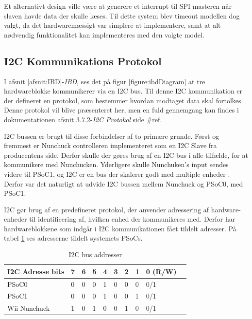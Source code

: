 \noindent Et alternativt design ville være at generere et interrupt til SPI masteren når slaven havde data der skulle læses. Til dette system blev timeout modellen dog valgt, da det hardwaremæssigt var simplere at implementere, samt at alt nødvendig funktionalitet kan implementeres med den valgte model.

\subsection{I2C Kommunikations Protokol}
\label{afsnit:I2CProtokol}
I afsnit \ref{afsnit:IBD}-\textit{IBD}, ses det på figur \ref{figure:ibdDiagram} at tre hardwareblokke kommunikerer via en I2C bus. Til denne I2C kommunikation er der defineret en protokol, som bestemmer hvordan modtaget data skal fortolkes. Denne protokol vil blive præsenteret her, men en fuld gennemgang kan findes i dokumentationen afsnit 3.7.2-\textit{I2C Protokol} side \#ref.\newline

\noindent I2C bussen er brugt til disse forbindelser af to primære grunde. Først og fremmest er Nunchuck controlleren implementeret som en I2C Slave fra producentens side. Derfor skulle der gøres brug af en I2C bus i alle tilfælde, for at kommunikere med Nunchucken. Yderligere skulle Nunchuken's input sendes videre til PSoC1, og I2C er en bus der skalerer godt med multiple enheder \cite{i2cbus}. Derfor var det naturligt at udvide I2C bussen mellem Nunchuck og PSoC0, med PSoC1.\newline

\noindent I2C gør brug af en predefineret protokol, der anvender adressering af hardware-enheder til identificering af, hvilken enhed der kommunikeres med. Derfor har hardwareblokkene som indgår i I2C kommunikationen fået tildelt adresser. På tabel \ref{table:I2CAddress} ses adresserne tildelt systemets PSoCs.

\begin{table}[H]
	\centering
	\begin{tabular}{llllllllll}
		\hline
		\multicolumn{1}{|l|}{I2C Adresse bits} & 7                        & 6                        & 5                        & 4 & 3 & 2 & \multicolumn{1}{l|}{1} & \multicolumn{1}{l|}{0 (R/W)} \\ \hline
		\rowcolor[HTML]{CBCEFB} 
		{\color[HTML]{000000} PSoC0}           & {\color[HTML]{000000} 0} & {\color[HTML]{000000} 0} & {\color[HTML]{000000} 0} & 1 & 0 & 0 & 0                      & 0/1                          \\
		PSoC1                                  & 0                        & 0                        & 0                        & 1 & 0 & 0 & 1                      & 0/1 \\
		\rowcolor[HTML]{CBCEFB} 
		{\color[HTML]{000000} Wii-Nunchuck}           & {\color[HTML]{000000} 1} & {\color[HTML]{000000} 0} & {\color[HTML]{000000} 1} & 0 & 0 & 1 & 0                      & 0/1                      
	\end{tabular}
	\caption{I2C bus addresser}
	\label{table:I2CAddress}
\end{table}

